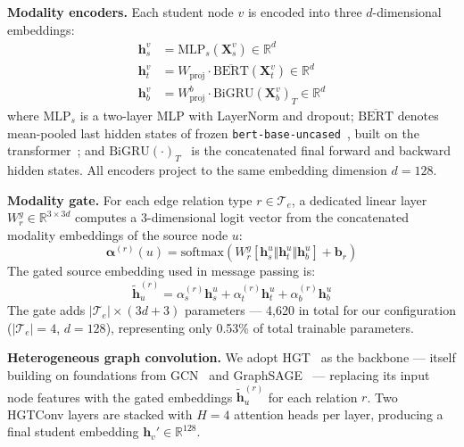 \documentclass[sigconf,review]{acmart}
\begin{document}
\textbf{Modality encoders.}
Each student node $v$ is encoded into three
$d$-dimensional embeddings:
\begin{align}
  \mathbf{h}_s^v &= \text{MLP}_s(\mathbf{X}_s^v)
    \in \mathbb{R}^d \label{eq:struct-enc} \\
  \mathbf{h}_t^v &= W_{\text{proj}} \cdot
    \overline{\text{BERT}}(\mathbf{X}_t^v)
    \in \mathbb{R}^d \label{eq:text-enc} \\
  \mathbf{h}_b^v &= W_{\text{proj}}^b \cdot
    \text{BiGRU}(\mathbf{X}_b^v)_{T}
    \in \mathbb{R}^d \label{eq:behav-enc}
\end{align}
where $\text{MLP}_s$ is a two-layer MLP with
LayerNorm and dropout; $\overline{\text{BERT}}$
denotes mean-pooled last hidden states of frozen
\texttt{bert-base-uncased}~\citep{devlin2019bert},
built on the transformer~\citep{vaswani2017attention};
and $\text{BiGRU}(\cdot)_T$~\citep{cho2014gru}
is the concatenated final forward and backward hidden
states.
All encoders project to the same embedding
dimension $d = 128$.

\textbf{Modality gate.}
For each edge relation type $r \in \mathcal{T}_e$,
a dedicated linear layer $W_r^g \in
\mathbb{R}^{3 \times 3d}$ computes a 3-dimensional
logit vector from the concatenated modality
embeddings of the source node $u$:
\begin{equation}
  \boldsymbol{\alpha}^{(r)}(u) = \text{softmax}
  \!\left( W_r^g \left[ \mathbf{h}_s^u \Vert
  \mathbf{h}_t^u \Vert \mathbf{h}_b^u \right]
  + \mathbf{b}_r \right)
\end{equation}
The gated source embedding used in message passing is:
\begin{equation}
  \tilde{\mathbf{h}}_u^{(r)} =
    \alpha_s^{(r)} \mathbf{h}_s^u +
    \alpha_t^{(r)} \mathbf{h}_t^u +
    \alpha_b^{(r)} \mathbf{h}_b^u
\end{equation}
The gate adds $|\mathcal{T}_e| \times (3d + 3)$
parameters --- 4,620 in total for our configuration
($|\mathcal{T}_e| = 4$, $d = 128$), representing
only 0.53\% of total trainable parameters.

\textbf{Heterogeneous graph convolution.}
We adopt HGT~\citep{hu2020heterogeneous} as the
backbone --- itself building on foundations from
GCN~\citep{kipf2017semi} and
GraphSAGE~\citep{hamilton2017inductive} ---
replacing its input node features with the
gated embeddings $\tilde{\mathbf{h}}_u^{(r)}$ for
each relation $r$. Two HGTConv layers are stacked
with $H = 4$ attention heads per layer, producing
a final student embedding
$\mathbf{h}_v' \in \mathbb{R}^{128}$.
\end{document}
